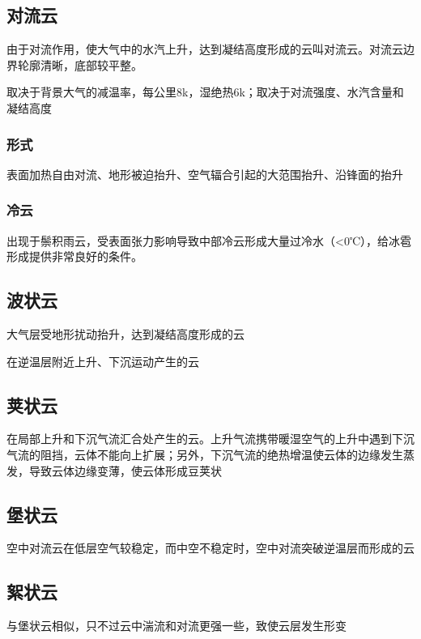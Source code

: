 \documentclass[UTF8,11pt]{ctexbook}
\begin{document}
\subsection{对流云}

由于对流作用，使大气中的水汽上升，达到凝结高度形成的云叫对流云。对流云边界轮廓清晰，底部较平整。

取决于背景大气的减温率，每公里8k，湿绝热6k；取决于对流强度、水汽含量和凝结高度

\subsubsection{形式}

表面加热自由对流、地形被迫抬升、空气辐合引起的大范围抬升、沿锋面的抬升

\subsubsection{冷云}

出现于鬃积雨云，受表面张力影响导致中部冷云形成大量过冷水（<0℃），给冰雹形成提供非常良好的条件。

\subsection{波状云}

大气层受地形扰动抬升，达到凝结高度形成的云

在逆温层附近上升、下沉运动产生的云

\subsection{荚状云}

在局部上升和下沉气流汇合处产生的云。上升气流携带暖湿空气的上升中遇到下沉气流的阻挡，云体不能向上扩展；另外，下沉气流的绝热增温使云体的边缘发生蒸发，导致云体边缘变薄，使云体形成豆荚状

\subsection{堡状云}

空中对流云在低层空气较稳定，而中空不稳定时，空中对流突破逆温层而形成的云

\subsection{絮状云}

与堡状云相似，只不过云中湍流和对流更强一些，致使云层发生形变
\end{document}
